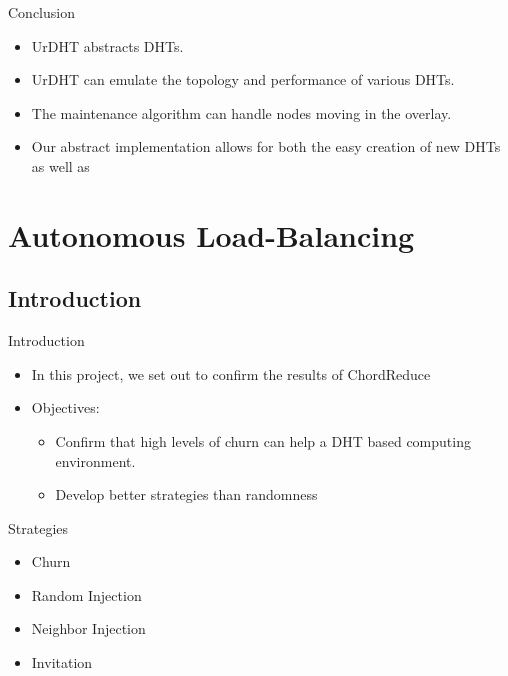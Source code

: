\documentclass[11pt]{beamer}
\begin{document}
\begin{frame}{Conclusion}
\begin{itemize}
	\item UrDHT abstracts DHTs.
	\item UrDHT can emulate the topology and performance of various DHTs.
	\item The maintenance algorithm can handle nodes moving in the overlay.
	\item Our abstract implementation allows for both the easy creation of new DHTs as well as 

\end{itemize}
\end{frame}

\section{Autonomous Load-Balancing}

\subsection{Introduction}
\begin{frame}{Introduction}
	\begin{itemize}
		
		\item In this project, we set out to confirm the results of ChordReduce
		\item Objectives:
		\begin{itemize}
			\item Confirm that high levels of churn can help a DHT based computing environment.
			\item Develop better strategies than randomness
		\end{itemize}
	\end{itemize}
\end{frame}



\begin{frame}{Strategies}
	\begin{itemize}
		\item Churn
		\item Random Injection
		\item Neighbor Injection
		\item Invitation
	\end{itemize}
\end{frame}
\end{document}
